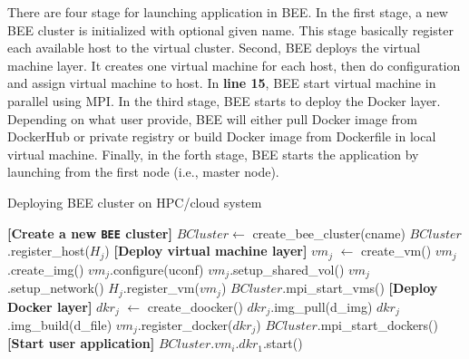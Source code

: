 There are four stage for launching application in BEE. In the first stage, a new BEE cluster is initialized with optional given name. This stage basically register each available host to the virtual cluster. Second, BEE deploys the virtual machine layer. It creates one virtual machine for each host, then do configuration and assign virtual machine to host. In \textbf{line 15}, BEE start virtual machine in parallel using MPI. In the third stage, BEE starts to deploy the Docker layer. Depending on what user provide, BEE will either pull Docker image from DockerHub or private registry or build Docker image from Dockerfile in local virtual machine. Finally, in the forth stage, BEE starts the application by launching from the first node (i.e., master node).


\begin{algorithm}
\caption{Deploying BEE cluster on HPC/cloud system}
\label{bee-launch}
\begin{algorithmic}[1]
\STATE \textbf{[Create a new \texttt{BEE} cluster]}
\STATE $BCluster \leftarrow$ create\_bee\_cluster(cname)
	\STATE $BCluster$.register\_host($H_j$)
\ENDFOR
\STATE \textbf{[Deploy virtual machine layer]}
	\STATE $vm_j$ $\leftarrow$ create\_vm()
	\STATE $vm_j$.create\_img() 
	\STATE $vm_j$.configure(uconf) 
	\STATE $vm_j$.setup\_shared\_vol()
	\STATE $vm_j$.setup\_network()
	\STATE $H_j$.register\_vm($vm_j$)
\ENDFOR
\STATE $BCluster$.mpi\_start\_vms()
\STATE \textbf{[Deploy Docker layer]}
	\STATE $dkr_j$ $\leftarrow$ create\_doocker()
		\STATE $dkr_j$.img\_pull(d\_img)
	\ELSE
		\STATE $dkr_j$.img\_build(d\_file)
    \ENDIF
	$vm_j$.register\_docker($dkr_j$)
\ENDFOR
\STATE $BCluster$.mpi\_start\_dockers()
\STATE \textbf{[Start user application]}
\STATE $BCluster$.$vm_i$.$dkr_1$.start()

\end{algorithmic}
\end{algorithm}


